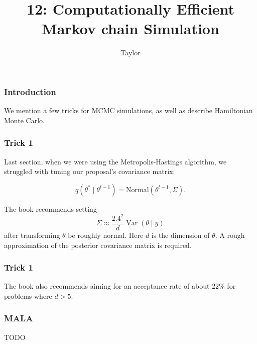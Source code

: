 \documentclass{beamer}
\title["12"]{12: Computationally Efficient Markov chain Simulation}
\author{Taylor}
\institute[UVA] 
{
University of Virginia \\
\medskip
\textit{} 
}
\date{}
\begin{document}

\begin{frame}
\titlepage 
\end{frame}

\begin{frame}
\frametitle{Introduction}

We mention a few tricks for MCMC simulations, as well as describe Hamiltonian Monte Carlo.


\end{frame}

\begin{frame}
\frametitle{Trick 1}

Last section, when we were using the Metropolis-Hastings algorithm, we struggled with tuning our proposal's covariance matrix:

$$
q(\theta^* \mid \theta^{t-1}) = \text{Normal}(\theta^{t-1}, \Sigma).
$$

The book recommends setting 
$$
\Sigma \approx \frac{2.4^2}{d} \operatorname{Var}(\theta \mid y)
$$
after transforming $\theta$ be roughly normal. Here $d$ is the dimension of $\theta$. A rough approximation of the posterior covariance matrix is required.





\end{frame}

\begin{frame}
\frametitle{Trick 1}

The book also recommends aiming for an acceptance rate of about $22\%$ for problems where $d > 5$. 

\end{frame}

\begin{frame}
\frametitle{MALA}

TODO

\end{frame}
\end{document}

